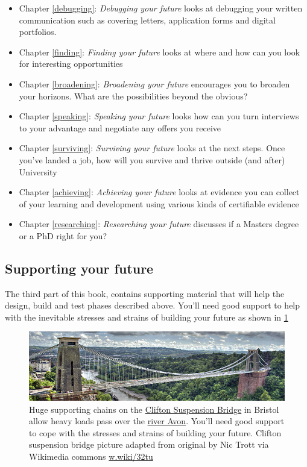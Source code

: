 \documentclass[
]{book}
\providecommand{\tightlist}{%
  \setlength{\itemsep}{0pt}\setlength{\parskip}{0pt}}
\begin{document}
\begin{itemize}
\tightlist
\item
  Chapter \ref{debugging}: \emph{Debugging your future} looks at debugging your written communication such as covering letters, application forms and digital portfolios.
\item
  Chapter \ref{finding}: \emph{Finding your future} looks at where and how can you look for interesting opportunities
\item
  Chapter \ref{broadening}: \emph{Broadening your future} encourages you to broaden your horizons. What are the possibilities beyond the obvious?
\item
  Chapter \ref{speaking}: \emph{Speaking your future} looks how can you turn interviews to your advantage and negotiate any offers you receive
\item
  Chapter \ref{surviving}: \emph{Surviving your future} looks at the next steps. Once you've landed a job, how will you survive and thrive outside (and after) University
\item
  Chapter \ref{achieving}: \emph{Achieving your future} looks at evidence you can collect of your learning and development using various kinds of certifiable evidence
\item
  Chapter \ref{researching}: \emph{Researching your future} discusses if a Masters degree or a PhD right for you?
\end{itemize}

\hypertarget{partiii}{%
\subsection{Supporting your future}\label{partiii}}

The third part of this book, contains supporting material that will help the design, build and test phases described above. You'll need good support to help with the inevitable stresses and strains of building your future as shown in \ref{fig:clifton-fig}

\begin{figure}

{\centering \includegraphics[width=1\linewidth]{images/clifton} 

}

\caption{Huge supporting chains on the \href{https://en.wikipedia.org/wiki/Clifton_Suspension_Bridge}{Clifton Suspension Bridge} in Bristol allow heavy loads pass over the \href{https://en.wikipedia.org/wiki/River_Avon,_Bristol}{river Avon}. You'll need good support to cope with the stresses and strains of building your future. Clifton suspension bridge picture adapted from original by Nic Trott via Wikimedia commons \href{https://w.wiki/32tu}{w.wiki/32tu}}\label{fig:clifton-fig}
\end{figure}
\end{document}
